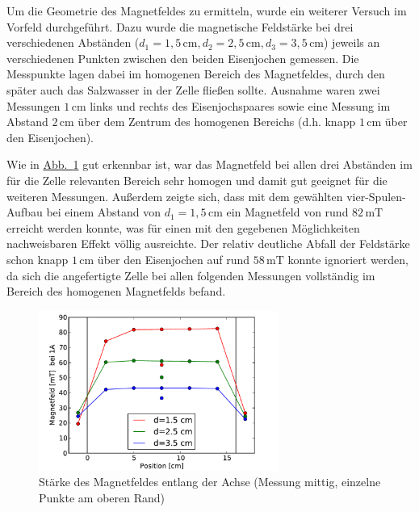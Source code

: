 \documentclass[11pt]{scrartcl}
\newcommand{\unit}[1]{\ensuremath{\,\mathrm{#1}}} %
\newcommand{\abb}[1]{\hyperref[#1]{Abb.~\ref{#1}}}
\begin{document}
Um die Geometrie des Magnetfeldes zu ermitteln, wurde ein weiterer Versuch im Vorfeld durchgeführt. Dazu wurde die magnetische Feldstärke bei drei verschiedenen Abständen ($d_1=1,5 \unit{cm}, d_2=2,5 \unit{cm}, d_3=3,5 \unit{cm}$) jeweils an verschiedenen Punkten zwischen den beiden Eisenjochen gemessen. Die Messpunkte lagen dabei im homogenen Bereich des Magnetfeldes, durch den später auch das Salzwasser in der Zelle fließen sollte. Ausnahme waren zwei Messungen $1 \unit{cm}$ links und rechts des Eisenjochspaares sowie eine Messung im Abstand $2 \unit{cm}$ über dem Zentrum des homogenen Bereichs (d.h. knapp $1 \unit{cm}$ über den Eisenjochen).

Wie in \abb{vormessung_magnetfeld} gut erkennbar ist, war das Magnetfeld bei allen drei Abständen im für die Zelle relevanten Bereich sehr homogen und damit gut geeignet für die weiteren Messungen. Außerdem zeigte sich, dass mit dem gewählten vier-Spulen-Aufbau bei einem Abstand von $d_1=1,5 \unit{cm}$ ein Magnetfeld von rund $82 \unit{mT}$ erreicht werden konnte, was für einen mit den gegebenen Möglichkeiten nachweisbaren Effekt völlig ausreichte.
Der relativ deutliche Abfall der Feldstärke schon knapp $1 \unit{cm}$ über den Eisenjochen auf rund $58 \unit{mT}$ konnte ignoriert werden, da sich die angefertigte Zelle bei allen folgenden Messungen vollständig im Bereich des homogenen Magnetfelds befand. 

\begin{figure}[h]
\begin{center}
\includegraphics[width=0.7\textwidth]{images/vormessung_magnetfeld.pdf}
\end{center}
\vspace{-1.5\baselineskip}
\caption{Stärke des Magnetfeldes entlang der Achse (Messung mittig, einzelne Punkte am oberen Rand)}
\label{vormessung_magnetfeld}
\end{figure}
\end{document}
